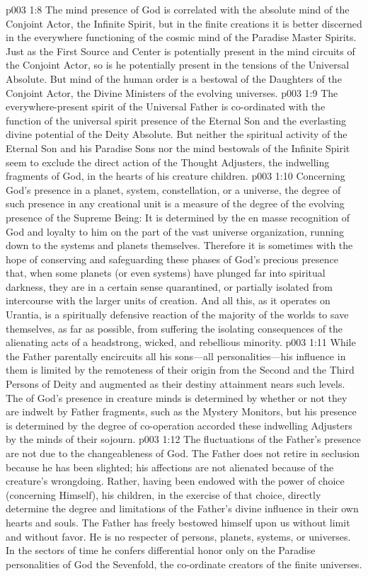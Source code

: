 \vs p003 1:8 The mind presence of God is correlated with the absolute mind of the Conjoint Actor, the Infinite Spirit, but in the finite creations it is better discerned in the everywhere functioning of the cosmic mind of the Paradise Master Spirits. Just as the First Source and Center is potentially present in the mind circuits of the Conjoint Actor, so is he potentially present in the tensions of the Universal Absolute. But mind of the human order is a bestowal of the Daughters of the Conjoint Actor, the Divine Ministers of the evolving universes.
\vs p003 1:9 The everywhere\hyp{}present spirit of the Universal Father is co\hyp{}ordinated with the function of the universal spirit presence of the Eternal Son and the everlasting divine potential of the Deity Absolute. But neither the spiritual activity of the Eternal Son and his Paradise Sons nor the mind bestowals of the Infinite Spirit seem to exclude the direct action of the Thought Adjusters, the indwelling fragments of God, in the hearts of his creature children.
\vs p003 1:10 Concerning God’s presence in a planet, system, constellation, or a universe, the degree of such presence in any creational unit is a measure of the degree of the evolving presence of the Supreme Being: It is determined by the en masse recognition of God and loyalty to him on the part of the vast universe organization, running down to the systems and planets themselves. Therefore it is sometimes with the hope of conserving and safeguarding these phases of God’s precious presence that, when some planets (or even systems) have plunged far into spiritual darkness, they are in a certain sense quarantined, or partially isolated from intercourse with the larger units of creation. And all this, as it operates on Urantia, is a spiritually defensive reaction of the majority of the worlds to save themselves, as far as possible, from suffering the isolating consequences of the alienating acts of a headstrong, wicked, and rebellious minority.
\pc \vs p003 1:11 While the Father parentally encircuits all his sons---all personalities---his influence in them is limited by the remoteness of their origin from the Second and the Third Persons of Deity and augmented as their destiny attainment nears such levels. The  of God’s presence in creature minds is determined by whether or not they are indwelt by Father fragments, such as the Mystery Monitors, but his  presence is determined by the degree of co\hyp{}operation accorded these indwelling Adjusters by the minds of their sojourn.\plusone
\vs p003 1:12 The fluctuations of the Father’s presence are not due to the changeableness of God. The Father does not retire in seclusion because he has been slighted; his affections are not alienated because of the creature’s wrongdoing. Rather, having been endowed with the power of choice (concerning Himself), his children, in the exercise of that choice, directly determine the degree and limitations of the Father’s divine influence in their own hearts and souls. The Father has freely bestowed himself upon us without limit and without favor. He is no respecter of persons, planets, systems, or universes. In the sectors of time he confers differential honor only on the Paradise personalities of God the Sevenfold, the co\hyp{}ordinate creators of the finite universes.
